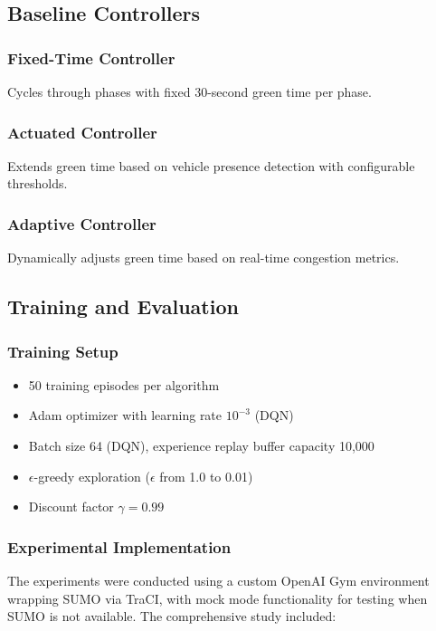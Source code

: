 \documentclass[conference]{IEEEtran}
\begin{document}
\subsection{Baseline Controllers}

\subsubsection{Fixed-Time Controller}
Cycles through phases with fixed 30-second green time per phase.

\subsubsection{Actuated Controller}
Extends green time based on vehicle presence detection with configurable thresholds.

\subsubsection{Adaptive Controller}
Dynamically adjusts green time based on real-time congestion metrics.

\subsection{Training and Evaluation}

\subsubsection{Training Setup}
\begin{itemize}
\item 50 training episodes per algorithm
\item Adam optimizer with learning rate $10^{-3}$ (DQN)
\item Batch size 64 (DQN), experience replay buffer capacity 10,000
\item $\epsilon$-greedy exploration ($\epsilon$ from 1.0 to 0.01)
\item Discount factor $\gamma = 0.99$
\end{itemize}

\subsubsection{Experimental Implementation}
The experiments were conducted using a custom OpenAI Gym environment wrapping SUMO via TraCI, with mock mode functionality for testing when SUMO is not available. The comprehensive study included:
\end{document}
